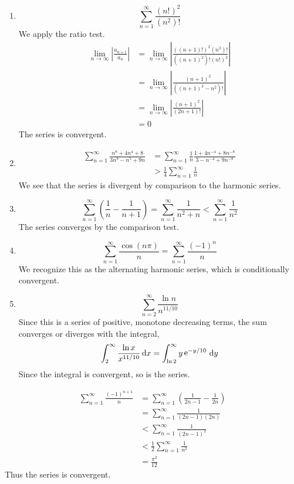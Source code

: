 {\begin{Solution}
\begin{enumerate}
    as $n \to \infty$, the series is divergent.
  \item
    \[
    \sum_{n=1}^\infty \frac{ (n!)^2 }{ (n^2)! }
    \]
    We apply the ratio test.
    \begin{align*}
      \lim_{n \to \infty} \left| \frac{a_{n+1}}{a_n} \right|
      &= \lim_{n \to \infty} \left| \frac{ ((n+1)!)^2 (n^2)! }{ ((n+1)^2)! (n!)^2 } \right|
      \\
      &= \lim_{n \to \infty} \left| \frac{ (n+1)^2 }{ ((n+1)^2 - n^2)! } \right|
      \\
      &= \lim_{n \to \infty} \left| \frac{ (n+1)^2 }{ (2 n + 1)! } \right|
      \\
      &= 0
    \end{align*}
    The series is convergent.
  \item
    \begin{align*} 
      \sum_{n=1}^\infty \frac{n^8 + 4 n^4 + 8}{3 n^9 - n^5 + 9 n}
      &= \sum_{n=1}^\infty \frac{1}{n} \frac{1 + 4 n^{-4} + 8 n^{-8}}{3 - n^{-4} + 9 n^{-8}}
      \\
      &> \frac{1}{4} \sum_{n=1}^\infty \frac{1}{n}
    \end{align*}
    We see that the series is divergent by comparison to the harmonic series.
  \item
    \[
    \sum_{n=1}^\infty \left( \frac{1}{n} - \frac{1}{n+1} \right)
    = \sum_{n=1}^\infty \frac{1}{n^2 + n}
    < \sum_{n=1}^\infty \frac{1}{n^2}
    \]
    The series converges by the comparison test.
  \item
    \[
    \sum_{n=1}^\infty \frac{\cos( n \pi )}{n}
    = \sum_{n=1}^\infty \frac{(-1)^n}{n}
    \]
    We recognize this as the alternating harmonic series, which is 
    conditionally convergent.
  \item
    \[
    \sum_{n=2}^\infty \frac{ \ln n }{ n^{11/10} }
    \]
    Since this is a series of positive, monotone decreasing 
    terms, the sum converges or diverges with the integral,
    \[
    \int_2^\infty \frac{\ln x}{x^{11/10}}\,\mathrm{d} x = \int_{\ln 2}^\infty y \mathop{\mathrm{e}}\nolimits^{-y/10}\,\mathrm{d} y
    \]
    Since the integral is convergent, so is the series.
  \end{enumerate}
\end{Solution}


\begin{Solution}
  \label{solution alternating harmonic series}
  \begin{align*}
    \sum_{n = 1}^\infty \frac{(-1)^{n+1}}{n} 
    &= \sum_{n = 1}^\infty \left( \frac{1}{2 n - 1} - \frac{1}{2 n} \right) 
    \\
    &= \sum_{n = 1}^\infty \frac{1}{(2 n - 1)(2 n)} 
    \\
    &< \sum_{n = 1}^\infty \frac{1}{(2 n - 1)^2} 
    \\
    &< \frac{1}{2} \sum_{n = 1}^\infty \frac{1}{n^2} 
    \\
    &= \frac{\pi^2}{12}
  \end{align*}
  Thus the series is convergent.
\end{Solution}


}
